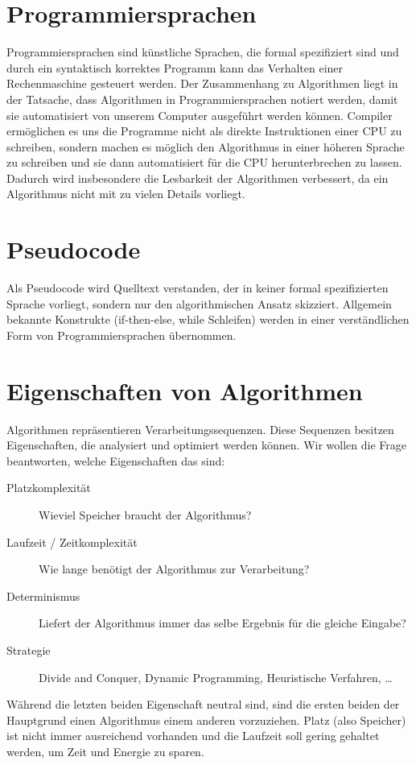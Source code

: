 \section{Programmiersprachen}
%
Programmiersprachen sind künstliche Sprachen, die formal spezifiziert sind und durch ein syntaktisch korrektes Programm kann das Verhalten einer Rechenmaschine gesteuert werden. Der Zusammenhang zu Algorithmen liegt in der Tatsache, dass Algorithmen in Programmiersprachen notiert werden, damit sie automatisiert von unserem Computer ausgeführt werden können. Compiler ermöglichen es uns die Programme nicht als direkte Instruktionen einer CPU zu schreiben, sondern machen es möglich den Algorithmus in einer höheren Sprache zu schreiben und sie dann automatisiert für die CPU herunterbrechen zu lassen. Dadurch wird insbesondere die Lesbarkeit der Algorithmen verbessert, da ein Algorithmus nicht mit zu vielen Details vorliegt.

\section{Pseudocode}
%
Als Pseudocode wird Quelltext verstanden, der in keiner formal spezifizierten Sprache vorliegt, sondern nur den algorithmischen Ansatz skizziert. Allgemein bekannte Konstrukte (if-then-else, while Schleifen) werden in einer verständlichen Form von Programmiersprachen übernommen.

\section{Eigenschaften von Algorithmen}
%
Algorithmen repräsentieren Verarbeitungssequenzen. Diese Sequenzen besitzen Eigenschaften, die analysiert und optimiert werden können. Wir wollen die Frage beantworten, welche Eigenschaften das sind:
%
\begin{description}
 \item[Platzkomplexität] Wieviel Speicher braucht der Algorithmus?
 \item[Laufzeit / Zeitkomplexität] Wie lange benötigt der Algorithmus zur Verarbeitung?
 \item[Determinismus] Liefert der Algorithmus immer das selbe Ergebnis für die gleiche Eingabe?
 \item[Strategie] Divide and Conquer, Dynamic Programming, Heuristische Verfahren, \dots
\end{description}

Während die letzten beiden Eigenschaft neutral sind, sind die ersten beiden der Hauptgrund einen Algorithmus einem anderen vorzuziehen. Platz (also Speicher) ist nicht immer ausreichend vorhanden und die Laufzeit soll gering gehaltet werden, um Zeit und Energie zu sparen.

